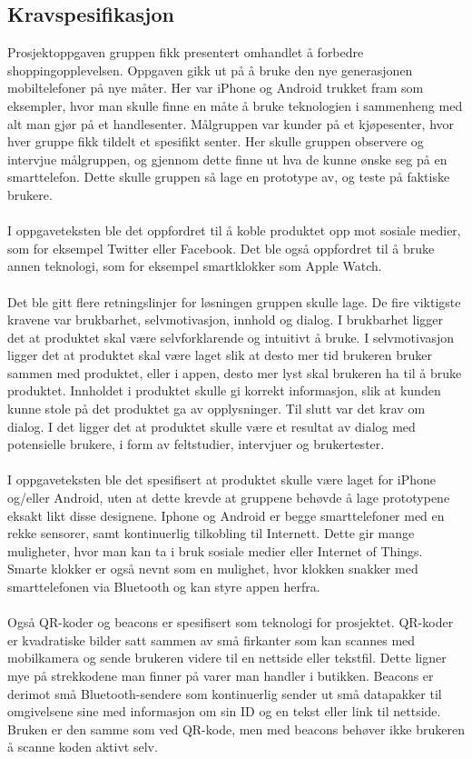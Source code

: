 \subsection{Kravspesifikasjon}
Prosjektoppgaven gruppen fikk presentert omhandlet å forbedre shoppingopplevelsen. Oppgaven gikk ut på å bruke den nye generasjonen mobiltelefoner på nye måter. Her var iPhone og Android trukket fram som eksempler, hvor man skulle finne en måte å bruke teknologien i sammenheng med alt man gjør på et handlesenter. Målgruppen var kunder på et kjøpesenter, hvor hver gruppe fikk tildelt et spesifikt senter. Her skulle gruppen observere og intervjue målgruppen, og gjennom dette finne ut hva de kunne ønske seg på en smarttelefon. Dette skulle gruppen så lage en prototype av, og teste på faktiske brukere.
\\\\
I oppgaveteksten ble det oppfordret til å koble produktet opp mot sosiale medier, som for eksempel Twitter eller Facebook. Det ble også oppfordret til å bruke annen teknologi, som for eksempel smartklokker som Apple Watch. 
\\\\
Det ble gitt flere retningslinjer for løsningen gruppen skulle lage. De fire viktigste kravene var brukbarhet, selvmotivasjon, innhold og dialog. I brukbarhet ligger det at produktet skal være selvforklarende og intuitivt å bruke. I selvmotivasjon ligger det at produktet skal være laget slik at desto mer tid brukeren bruker sammen med produktet, eller i appen, desto mer lyst skal brukeren ha til å bruke produktet. Innholdet i produktet skulle gi korrekt informasjon, slik at kunden kunne stole på det produktet ga av opplysninger. Til slutt var det krav om dialog. I det ligger det at produktet skulle være et resultat av dialog med potensielle brukere, i form av feltstudier, intervjuer og brukertester.
\\\\
I oppgaveteksten ble det spesifisert at produktet skulle være laget for iPhone og/eller Android, uten at dette krevde at gruppene behøvde å lage prototypene eksakt likt disse designene. Iphone og Android er begge smarttelefoner med en rekke sensorer, samt kontinuerlig tilkobling til Internett. Dette gir mange muligheter, hvor man kan ta i bruk sosiale medier eller Internet of Things. Smarte klokker er også nevnt som en mulighet, hvor klokken snakker med smarttelefonen via Bluetooth og kan styre appen herfra. 
\\\\
Også QR-koder og beacons er spesifisert som teknologi for prosjektet. QR-koder er kvadratiske bilder satt sammen av små firkanter som kan scannes med mobilkamera og sende brukeren videre til en nettside eller tekstfil\cite{prosjektoppgaven}. Dette ligner mye på strekkodene man finner på varer man handler i butikken. Beacons er derimot små Bluetooth-sendere som kontinuerlig sender ut små datapakker til omgivelsene sine med informasjon om sin ID og en tekst eller link til nettside\cite{prosjektoppgaven}. Bruken er den samme som ved QR-kode, men med beacons behøver ikke brukeren å scanne koden aktivt selv.
